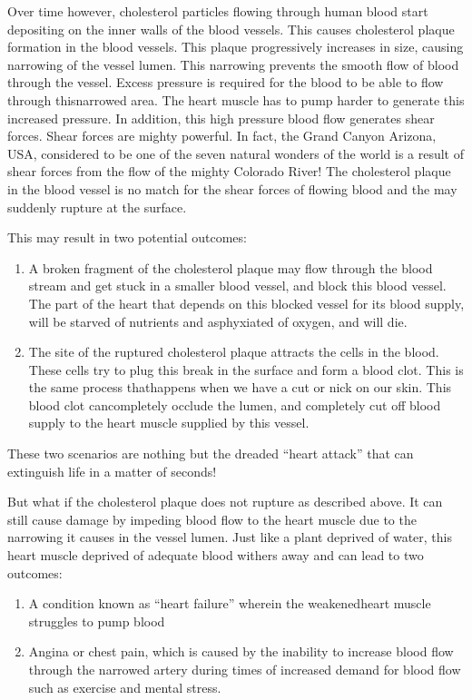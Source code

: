 Over time however, chole\-sterol particles flowing through human blood start depositing on the inner walls of the blood vessels. This causes choleste\-rol plaque formation in the blood vessels. This plaque progressively increases in size, causing narrowing of the vessel lumen. This narro\-wing prevents the smooth flow of blood through the vessel. Excess pressure is required for the blood to be able to flow through this\break narrowed area. The heart muscle has to pump harder to generate this increased pressure. In addition, this high pressure blood flow gene\-rates shear forces. Shear forces are mighty powerful. In fact, the Grand Canyon Arizona, USA, considered to be one of the seven natural wonders of the world is a result of shear forces from the flow of the mighty Colorado River! The cholesterol plaque in the blood vessel is no match for the shear forces of flowing blood and the may suddenly rupture at the surface.

\noindent This may result in two potential outcomes:

\begin{enumerate}
\itemsep=0pt
\item A broken fragment of the choleste\-rol plaque may flow through the blood stream and get stuck in a smaller blood vessel, and block this blood vessel. The part of the heart that depends on this blocked vessel for its blood supply, will be starved of nutrients and asphyxiated of oxygen, and will die.
\item The site of the ruptured cholesterol plaque attracts the cells in the blood. These cells try to plug this break in the surface and form a blood clot. This is the same process that\break happens when we have a cut or nick on our skin. This blood clot can\break completely occlude the lumen, and completely cut off blood supply to the heart muscle supplied by this vessel.
\end{enumerate}

\clearpage
These two scenarios are nothing but the dreaded “heart attack” that can extinguish life in a matter of seconds!

But what if the cholesterol plaque does not rupture as described above. It can still cause damage by impeding blood flow to the heart muscle due to the narrowing it causes in the vessel lumen. Just like a plant deprived of water, this heart muscle deprived of adequate blood withers away and can lead to two outcomes:
\begin{enumerate}
\itemsep=0pt
\item A condition known as “heart failure” wherein the weakened\break heart muscle struggles to pump blood
\item Angina or chest pain, which is caused by the inability to increase blood flow through the narrowed artery during times of increa\-sed demand for blood flow such as exercise and mental stress.
\end{enumerate}

